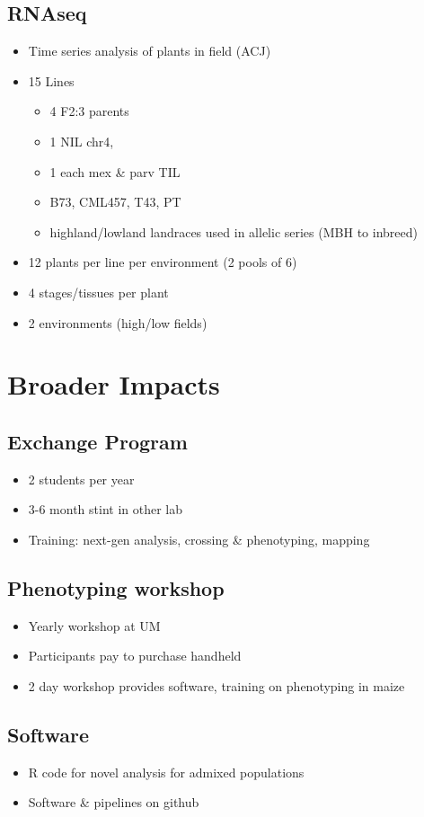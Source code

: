 \documentclass[]{article}
\begin{document}
\subsection { RNAseq }
	\begin{itemize}
		\item Time series analysis of plants in field (ACJ)
		\item 15 Lines
			\begin{itemize}
				\item 4 F2:3 parents
				\item 1 NIL chr4, 
				\item 1 each mex \& parv TIL
				\item B73, CML457, T43, PT
				\item highland/lowland landraces used in allelic series (MBH to inbreed)
			\end{itemize}
		\item 12 plants per line per environment (2 pools of 6)
		\item 4 stages/tissues per plant
		\item 2 environments (high/low fields)
	\end{itemize}

\section { Broader Impacts }
\subsection { Exchange Program }
\begin{itemize}
\item 2 students per year
\item 3-6 month stint in other lab
\item Training: next-gen analysis, crossing \& phenotyping, mapping  
\end{itemize}
\subsection { Phenotyping workshop }
\begin{itemize}
\item Yearly workshop at UM
\item Participants pay to purchase handheld
\item 2 day workshop  provides software, training on phenotyping in maize
\end{itemize}
\subsection { Software }
\begin{itemize}
\item R code for novel analysis for admixed populations
\item Software \& pipelines on github
\end{itemize}
\end{document}
